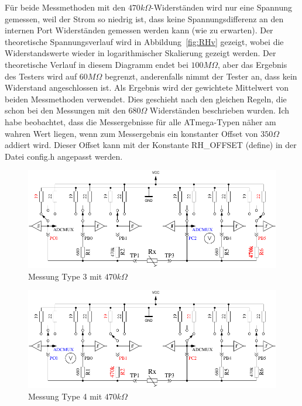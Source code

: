 Für beide Messmethoden mit den \(470k\Omega\)-Widerständen wird nur eine Spannung gemessen, weil der Strom
so niedrig ist, dass keine Spannungsdifferenz an den internen Port Widerständen gemessen werden kann (wie zu erwarten).
Der theoretische Spannungsverlauf wird in Abbildung~\ref{fig:RHv} gezeigt, wobei die Widerstandswerte wieder in
logarithmischer Skalierung gezeigt werden.
Der theoretische Verlauf in diesem Diagramm endet bei \(100M\Omega\), aber das Ergebnis des Testers wird auf
 \(60M\Omega\) begrenzt, anderenfalls nimmt der Tester an, dass kein Widerstand angeschlossen ist.
Als Ergebnis wird der gewichtete Mittelwert von beiden Messmethoden verwendet. Dies geschieht nach den gleichen Regeln, die schon bei
den Messungen mit den  \(680\Omega\) Widerständen beschrieben wurden.
Ich habe beobachtet, dass die Messergebnisse für alle ATmega-Typen  näher am wahren Wert liegen, wenn zum Messergebnis
ein konstanter Offset von \(350\Omega\) addiert wird.
Dieser Offset kann mit der Konstante RH\_OFFSET (define) in der Datei config.h angepasst werden.

\begin{figure}[H]
\centering
\includegraphics[]{../FIG/ResistormessH1.pdf}
\caption{Messung Type 3 mit \(470k\Omega\) }
\label{fig:RH1mes}
\end{figure}

\begin{figure}[H]
 \centering
 \includegraphics[]{../FIG/ResistormessH2.pdf}
 \caption{Messung Type 4 mit \(470k\Omega\) }
\label{fig:RH2mes}
\end{figure}

